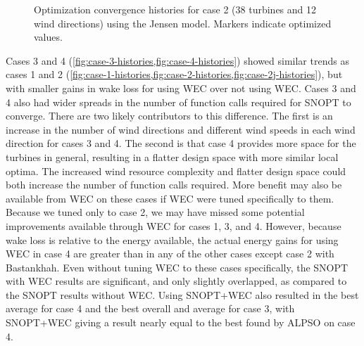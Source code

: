 \documentclass[journal abbreviation, manuscript]{copernicus}
\begin{document}
\begin{figure}[h!]
\begin{minipage}[t]{0.45\textwidth}
			\caption{Optimization convergence histories for case 2 (38 turbines and 12 wind directions) using the Jensen model. Markers indicate optimized values.}
			\label{fig:case-2j-histories}
		\end{minipage}
	\end{figure}
	
	Cases 3 and 4 (\ref{fig:case-3-histories,fig:case-4-histories}) showed similar trends as cases 1 and 2 (\ref{fig:case-1-histories,fig:case-2-histories,fig:case-2j-histories}), but with smaller gains in wake loss for using WEC over not using WEC. Cases 3 and 4 also had wider spreads in the number of function calls required for SNOPT to converge. There are two likely contributors to this difference. The first is an increase in the number of wind directions and different wind speeds in each wind direction for cases 3 and 4. The second is that case 4 provides more space for the turbines in general, resulting in a flatter design space with more similar local optima. The increased wind resource complexity and flatter design space could both increase the number of function calls required. More benefit may also be available from WEC on these cases if WEC were tuned specifically to them. Because we tuned only to case 2, we may have missed some potential improvements available through WEC for cases 1, 3, and 4. However, because wake loss is relative to the energy available, the actual energy gains for using WEC in case 4 are greater than in any of the other cases except case 2 with Bastankhah.  Even without tuning WEC to these cases specifically, the SNOPT with WEC results are significant, and only slightly overlapped, as compared to the SNOPT results without WEC. Using SNOPT+WEC also resulted in the best average for case 4 and the best overall and average for case 3, with SNOPT+WEC giving a result nearly equal to the best found by ALPSO on case 4.
	
\end{document}
